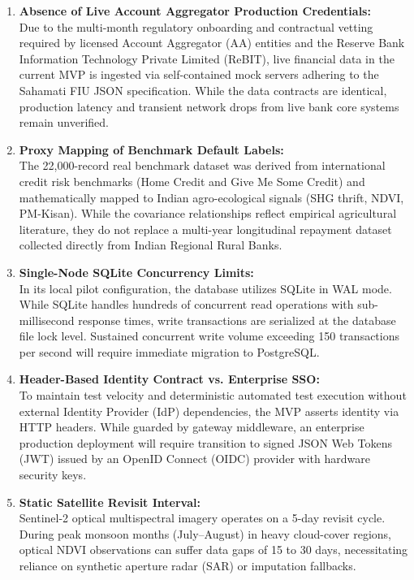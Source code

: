 \documentclass[11pt,a4paper,oneside]{report}
\begin{document}
\begin{enumerate}
  \item \textbf{Absence of Live Account Aggregator Production Credentials:}\\
  Due to the multi-month regulatory onboarding and contractual vetting required by licensed Account Aggregator (AA) entities and the Reserve Bank Information Technology Private Limited (ReBIT), live financial data in the current MVP is ingested via self-contained mock servers adhering to the Sahamati FIU JSON specification. While the data contracts are identical, production latency and transient network drops from live bank core systems remain unverified.

  \item \textbf{Proxy Mapping of Benchmark Default Labels:}\\
  The 22,000-record real benchmark dataset was derived from international credit risk benchmarks (Home Credit and Give Me Some Credit) and mathematically mapped to Indian agro-ecological signals (SHG thrift, NDVI, PM-Kisan). While the covariance relationships reflect empirical agricultural literature, they do not replace a multi-year longitudinal repayment dataset collected directly from Indian Regional Rural Banks.

  \item \textbf{Single-Node SQLite Concurrency Limits:}\\
  In its local pilot configuration, the database utilizes SQLite in WAL mode. While SQLite handles hundreds of concurrent read operations with sub-millisecond response times, write transactions are serialized at the database file lock level. Sustained concurrent write volume exceeding 150 transactions per second will require immediate migration to PostgreSQL.

  \item \textbf{Header-Based Identity Contract vs. Enterprise SSO:}\\
  To maintain test velocity and deterministic automated test execution without external Identity Provider (IdP) dependencies, the MVP asserts identity via HTTP headers. While guarded by gateway middleware, an enterprise production deployment will require transition to signed JSON Web Tokens (JWT) issued by an OpenID Connect (OIDC) provider with hardware security keys.

  \item \textbf{Static Satellite Revisit Interval:}\\
  Sentinel-2 optical multispectral imagery operates on a 5-day revisit cycle. During peak monsoon months (July--August) in heavy cloud-cover regions, optical NDVI observations can suffer data gaps of 15 to 30 days, necessitating reliance on synthetic aperture radar (SAR) or imputation fallbacks.
\end{enumerate}
\end{document}
